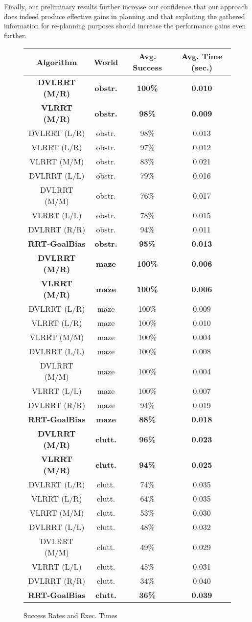 \documentclass[10pt,twoside,twocolumn]{article}
\begin{document}
Finally, our preliminary results further increase our confidence that our approach does indeed produce effective gains in
planning and that exploiting the gathered information for re-planning purposes should increase the performance gains
even further.

\begin{figure}[tp]
\begin{center}
\small{
\begin{tabular}{|cccc|}
\hline
Algorithm & World & Avg. Success & Avg. Time (sec.)\\
\hline
\bf{DVLRRT (M/R)} & \bf{obstr.} & \bf{100\%} & \bf{0.010}\\
\bf{VLRRT (M/R)} & \bf{obstr.} & \bf{98\%} & \bf{0.009} \\
DVLRRT (L/R) & obstr. & 98\% & 0.013 \\
VLRRT (L/R) & obstr. & 97\% & 0.012\\
VLRRT (M/M) & obstr. & 83\% & 0.021\\
DVLRRT (L/L) & obstr. & 79\% & 0.016\\
DVLRRT (M/M) & obstr. & 76\% & 0.017\\
VLRRT (L/L) & obstr. & 78\% & 0.015\\
DVLRRT (R/R) & obstr. & 94\% & 0.011\\
\bf{RRT-GoalBias} & \bf{obstr.} & \bf{95\%} & \bf{0.013}\\
\hline
\bf{DVLRRT (M/R)} & \bf{maze} & \bf{100\%} & \bf{0.006}\\
\bf{VLRRT (M/R)} & \bf{maze} & \bf{100\%} & \bf{0.006} \\
DVLRRT (L/R) & maze & 100\% & 0.009 \\
VLRRT (L/R) & maze & 100\% & 0.010\\
VLRRT (M/M) & maze & 100\% & 0.004\\
DVLRRT (L/L) & maze & 100\% & 0.008\\
DVLRRT (M/M) & maze & 100\% & 0.004\\
VLRRT (L/L) & maze & 100\% & 0.007\\
DVLRRT (R/R) & maze & 94\% & 0.019\\
\bf{RRT-GoalBias} & \bf{maze} & \bf{88\%} & \bf{0.018}\\
\hline
\bf{DVLRRT (M/R)} & \bf{clutt.} & \bf{96\%} & \bf{0.023}\\
\bf{VLRRT (M/R)} & \bf{clutt.} & \bf{94\%} & \bf{0.025} \\
DVLRRT (L/R) & clutt. & 74\% & 0.035 \\
VLRRT (L/R) & clutt. & 64\% & 0.035\\
VLRRT (M/M) & clutt. & 53\% & 0.030\\
DVLRRT (L/L) & clutt. & 48\% & 0.032\\
DVLRRT (M/M) & clutt. & 49\% & 0.029\\
VLRRT (L/L) & clutt. & 45\% & 0.031\\
DVLRRT (R/R) & clutt. & 34\% & 0.040\\
\bf{RRT-GoalBias} & \bf{clutt.} & \bf{36\%} & \bf{0.039}\\
\hline
\end{tabular}}
\end{center}
\caption{Success Rates and Exec. Times}
\end{figure}
\end{document}
